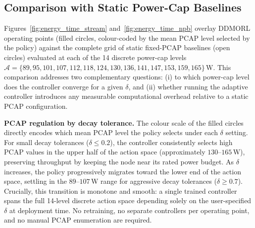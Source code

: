 \subsection{Comparison with Static Power-Cap Baselines}

Figures~\ref{fig:energy_time_stream} and~\ref{fig:energy_time_npb} overlay DDMORL operating points (filled circles, colour-coded by the mean PCAP level selected by the policy) against the complete grid of static fixed-PCAP baselines (open circles) evaluated at each of the 14 discrete power-cap levels $\mathcal{A} = \{89, 95, 101, 107, 112, 118, 124, 130, 136, 141, 147, 153, 159, 165\}$\,W. This comparison addresses two complementary questions: (i) to which power-cap level does the controller converge for a given $\delta$, and (ii) whether running the adaptive controller introduces any measurable computational overhead relative to a static PCAP configuration.

\noindent\textbf{PCAP regulation by decay tolerance.}
The colour scale of the filled circles directly encodes which mean PCAP level the policy selects under each $\delta$ setting. For small decay tolerances ($\delta \leq 0.2$), the controller consistently selects high PCAP values in the upper half of the action space (approximately $130$--$165$\,W), preserving throughput by keeping the node near its rated power budget. As $\delta$ increases, the policy progressively migrates toward the lower end of the action space, settling in the $89$--$107$\,W range for aggressive decay tolerances ($\delta \geq 0.7$). Crucially, this transition is monotone and smooth: a single trained controller spans the full 14-level discrete action space depending solely on the user-specified $\delta$ at deployment time. No retraining, no separate controllers per operating point, and no manual PCAP enumeration are required.


